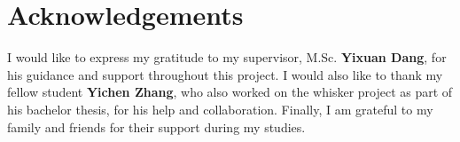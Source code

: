 \documentclass[AIRstudentthesis%
,optCharter%
,optBlackHeadings%
,optBlackRefs%
,optBiber%
,optBibstyleAlphabetic%
,optCenterEquations%
,optEnglish%
,optComputerModernMath
]{AIRlatex}
\begin{document}
    \frontmatter

    

    \section*{Acknowledgements}
    I would like to express my gratitude to my supervisor, M.Sc. \textbf{Yixuan Dang}, for his guidance and support throughout this project.
    I would also like to thank my fellow student \textbf{Yichen Zhang}, who also worked on the whisker project as part of his bachelor thesis, for his help and collaboration.
    Finally, I am grateful to my family and friends for their support during my studies.


    \AIRstudentthesisPrintTableOfContents
    \mainmatter
    
    
    
    
    
    
    

    \appendix
    

    {
        \printbibliography[heading=bibintoc]%
    }
\end{document}
